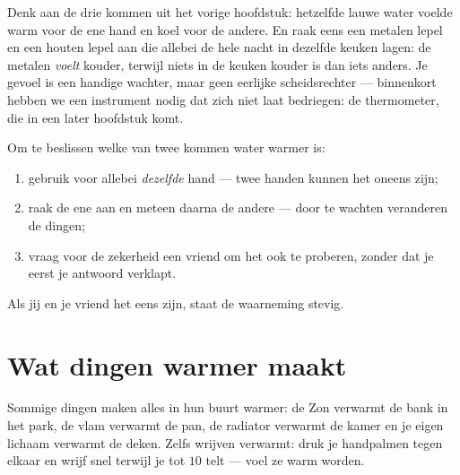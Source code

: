 \begin{remark}\label{rem:g1:hot-and-cold:fooled}
Denk aan de drie kommen uit het vorige hoofdstuk: hetzelfde lauwe
water voelde warm voor de ene hand en koel voor de andere. En raak
eens een metalen lepel en een houten lepel aan die allebei de hele
nacht in dezelfde keuken lagen: de metalen \emph{voelt} kouder,
terwijl niets in de keuken kouder is dan iets anders. Je gevoel is
een handige wachter, maar geen eerlijke scheidsrechter --- binnenkort
hebben we een instrument nodig dat zich niet laat bedriegen: de
thermometer, die in een later hoofdstuk komt.
\end{remark}

\begin{method}\label{met:g1:hot-and-cold:compare}
Om te beslissen welke van twee kommen water warmer is:
\begin{enumerate}
  \item gebruik voor allebei \emph{dezelfde} hand --- twee handen
        kunnen het oneens zijn;
  \item raak de ene aan en meteen daarna de andere --- door te
        wachten veranderen de dingen;
  \item vraag voor de zekerheid een vriend om het ook te proberen,
        zonder dat je eerst je antwoord verklapt.
\end{enumerate}
Als jij en je vriend het eens zijn, staat de waarneming stevig.
\end{method}

\section{Wat dingen warmer maakt}

\begin{example}[Verwarmers]\label{ex:g1:hot-and-cold:warmers}
Sommige dingen maken alles in hun buurt warmer: de Zon verwarmt de
bank in het park, de vlam verwarmt de pan, de radiator verwarmt de
kamer en je eigen lichaam verwarmt de deken. Zelfs wrijven verwarmt:
druk je handpalmen tegen elkaar en wrijf snel terwijl je tot $10$
telt --- voel ze warm worden.
\end{example}

